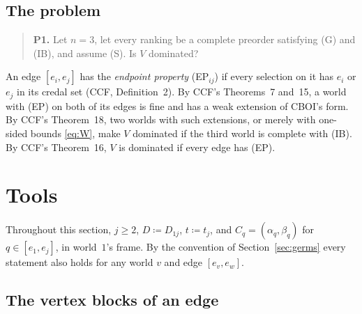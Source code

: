\documentclass[11pt]{article}
\theoremstyle{definition}\newtheorem{definition}[theorem]{Definition}
\theoremstyle{remark}\newtheorem{remark}[theorem]{Remark}
\begin{document}
\subsection{The problem}\label{sec:problem}

\begin{quote}
\textbf{P1.} Let $n=3$, let every ranking be a complete preorder satisfying
(G) and (IB), and assume (S). Is $V$ dominated?
\end{quote}
An edge $[e_i,e_j]$ has the \emph{endpoint property} (EP$_{ij}$) if every
selection on it has $e_i$ or $e_j$ in its credal set (CCF, Definition~2). By
CCF's Theorems~7 and~15, a world with (EP) on both of its edges is fine and
has a weak extension of CBOI's form. By CCF's Theorem~18, two worlds with
such extensions, or merely with one-sided bounds \eqref{eq:W}, make $V$
dominated if the third world is complete with (IB). By CCF's Theorem~16, $V$ is
dominated if every edge has (EP).

\section{Tools}\label{sec:tools}

Throughout this section, $j\ge2$, $D\coloneqq D_{1j}$, $t\coloneqq t_j$, and
$C_q=(\alpha_q,\beta_q)$ for $q\in[e_1,e_j]$, in world~$1$'s frame. By the
convention of Section~\ref{sec:germs} every statement also holds for any
world $v$ and edge $[e_v,e_w]$.

\subsection{The vertex blocks of an edge}
\end{document}
